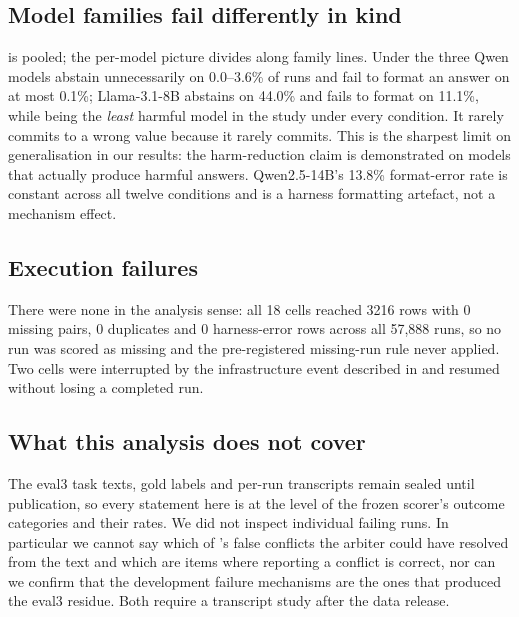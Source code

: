 \subsection{Model families fail differently in kind}

 is pooled; the per-model picture divides along family lines. Under  the three Qwen
models abstain unnecessarily on 0.0--3.6\% of runs and fail to format an answer on at most 0.1\%; Llama-3.1-8B
abstains on 44.0\% and fails to format on 11.1\%, while being the \emph{least} harmful model in the study under
every condition. It rarely commits to a wrong value because it rarely commits. This is the sharpest limit on
generalisation in our results: the harm-reduction claim is demonstrated on models that actually produce harmful
answers. Qwen2.5-14B's 13.8\% format-error rate is constant across all twelve conditions and is a harness
formatting artefact, not a mechanism effect.

\subsection{Execution failures}

There were none in the analysis sense: all 18 cells reached 3216 rows with 0 missing pairs, 0 duplicates and 0
harness-error rows across all 57{,}888 runs, so no run was scored as missing and the pre-registered missing-run
rule never applied. Two cells were interrupted by the infrastructure event described in
 and resumed without losing a completed run.

\subsection{What this analysis does not cover}

The eval3 task texts, gold labels and per-run transcripts remain sealed until publication, so every statement here
is at the level of the frozen scorer's outcome categories and their rates. We did not inspect individual failing
runs. In particular we cannot say which of 's false conflicts the arbiter could have resolved from the
text and which are items where reporting a conflict is correct, nor can we confirm that the development failure
mechanisms are the ones that produced the eval3 residue. Both require a transcript study after the data release.

